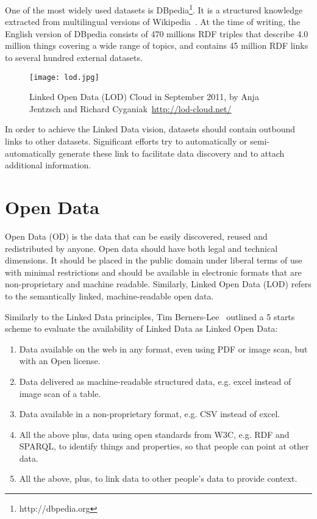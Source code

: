One of the most widely used datasets is DBpedia\footnote{http://dbpedia.org}. It is a structured knowledge extracted from multilingual versions of Wikipedia~\cite{Bizer:WebSemJorunal:09}. At the time of writing, the English version of DBpedia consists of 470 millions RDF triples that describe 4.0 million things covering a wide range of topics, and contains 45 million RDF links to several hundred external datasets.

\begin{figure}[ht!]
	\centering
	\texttt{[image: lod.jpg]}
	\caption{Linked Open Data (LOD) Cloud in September 2011, by Anja Jentzsch and Richard
	Cyganiak~\url{http://lod-cloud.net/}}
	\label{fig:lodcloud2011}
\end{figure}

In order to achieve the Linked Data vision, datasets should contain outbound links to other datasets. Significant efforts try to automatically or semi-automatically generate these link to facilitate data discovery and to attach additional information.

\section{Open Data}\label{sec:openData}

Open Data (OD) is the data that can be easily discovered, reused and redistributed by anyone. Open data should have both legal and technical dimensions. It should be placed in the public domain under liberal terms of use with minimal restrictions and should be available in electronic formats that are non-proprietary and machine readable. Similarly, Linked Open Data (LOD) refers to the semantically linked, machine-readable open data.

Similarly to the Linked Data principles, Tim Berners-Lee~\cite{Berners-Lee:W3C:06} outlined a 5 starts scheme to evaluate the availability of Linked Data as Linked Open Data:

\begin{enumerate}
	\item Data available on the web in any format, even using PDF or image scan, but with an Open license.
	\item Data delivered as machine-readable structured data, e.g. excel instead of image scan of a table.
	\item Data available in a non-proprietary format, e.g. CSV instead of excel.
	\item All the above plus, data using open standards from W3C, e.g. RDF and SPARQL, to identify things and properties, so that people can point at other data.
	\item All the above, plus, to link data to other people's data to provide context.
\end{enumerate}

